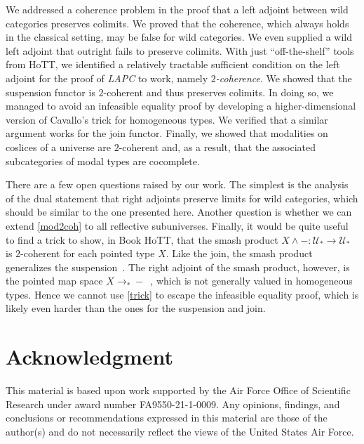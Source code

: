 \documentclass[10pt,a4paper]{article}
\theoremstyle{definition}
\theoremstyle{remark}
\newcommand{\U}{\mathcal{U}}
\newcommand{\0}{\mathbf{0}}
\newcommand{\1}{\mathbf{1}}
\newcommand{\2}{\mathbf{2}}
\begin{document}
We addressed a coherence problem in the proof that a left adjoint between wild categories preserves colimits. We proved that the coherence, which always holds in the classical setting, may be false for wild categories. We even supplied a wild left adjoint that outright fails to preserve colimits. With just ``off-the-shelf'' tools from HoTT, we identified a relatively tractable sufficient condition on the left adjoint for the proof of \emph{LAPC} to work, namely \emph{$2$-coherence}. We showed that the suspension functor is $2$-coherent and thus preserves colimits. In doing so, we managed to avoid an infeasible equality proof by developing a higher-dimensional version of Cavallo's trick for homogeneous types. We verified that a similar argument works for the join functor. Finally, we showed that modalities on coslices of a universe are $2$-coherent and, as a result, that the associated subcategories of modal types are cocomplete.

There are a few open questions raised by our work. The simplest is the analysis of the dual statement that right adjoints preserve limits for wild categories, which should be similar to the one presented here. Another question is whether we can extend \autoref{mod2coh} to all reflective subuniverses.
Finally, it would be quite useful to find a trick to show, in Book HoTT, that the smash product $X \land {-} : \U_{\ast} \to \U_{\ast}$ is $2$-coherent for each pointed type $X$. Like the join, the smash product generalizes the suspension~\cite[Proposition 4.2.1]{brunthesis}. The right adjoint of the smash product, however, is the pointed map space $X \to_{\ast} {-}$~\cite[Theorem 4.3.28]{vanDoornthesis}, which is not generally valued in homogeneous types. Hence we cannot use \autoref{trick} to escape the infeasible equality proof, which is likely even harder than the ones for the suspension and join.

\section*{Acknowledgment}
This material is based upon work supported by the Air Force Office of Scientific Research under award number FA9550-21-1-0009.
Any opinions, findings, and conclusions or recommendations expressed in this material are those of the author(s) and do not
necessarily reflect the views of the United States Air Force.




\end{document}
